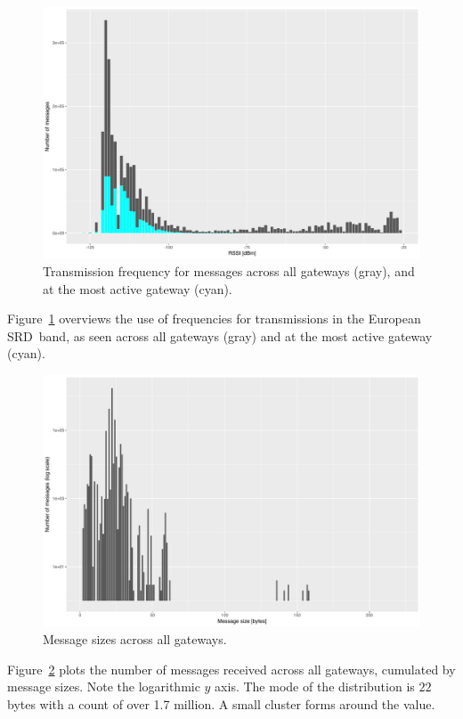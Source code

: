 \begin{figure}
  \centering
  \includegraphics[width=\columnwidth]{figures/rssi.pdf}
  \caption{Transmission frequency for messages across all gateways (gray), and at the most active gateway (cyan).}
  \label{fig:qrg}
\end{figure}

Figure~\ref{fig:qrg} overviews the use of frequencies for transmissions
in the European \gls{SRD} band, as seen across all gateways (gray) and
at the most active gateway (cyan).




\begin{figure}
  \centering
  \includegraphics[width=\columnwidth]{figures/sizes.pdf}
  \caption{Message sizes across all gateways.}
  \label{fig:sizes}
\end{figure}

Figure~\ref{fig:sizes} plots the number of messages received across
all gateways, cumulated by message sizes. Note the logarithmic $y$ axis.
The mode of the distribution is $22$ bytes with a count of over 1.7 million.
A small cluster forms around the value.
